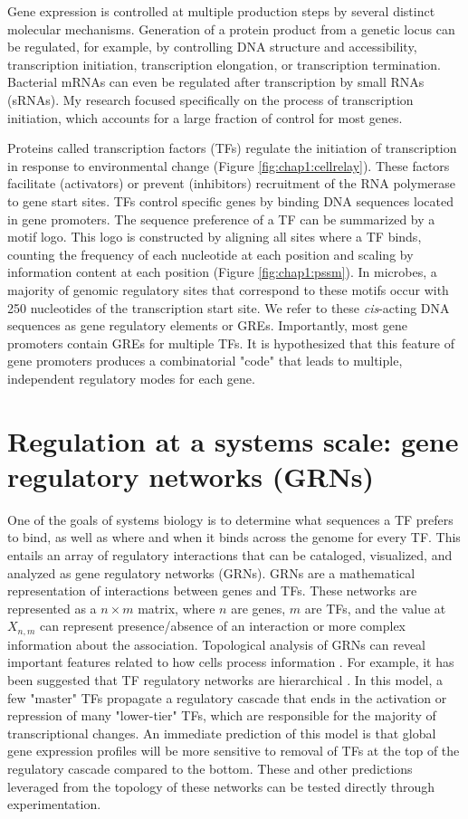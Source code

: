 \documentclass{article}
\begin{document}
Gene expression is controlled at multiple production steps by several distinct molecular mechanisms. Generation of a protein product from a genetic locus can be regulated, for example, by controlling DNA structure and accessibility, transcription initiation, transcription elongation, or transcription termination. Bacterial mRNAs can even be regulated after transcription by small RNAs (sRNAs). My research focused specifically on the process of transcription initiation, which accounts for a large fraction of control for most genes. 

Proteins called transcription factors (TFs) regulate the initiation of transcription in response to environmental change (Figure \ref{fig:chap1:cellrelay}). These factors facilitate (activators) or prevent (inhibitors) recruitment of the RNA polymerase to gene start sites. TFs control specific genes by binding DNA sequences located in gene promoters. The sequence preference of a TF can be summarized by a motif logo. This logo is constructed by aligning all sites where a TF binds, counting the frequency of each nucleotide at each position and scaling by information content at each position (Figure \ref{fig:chap1:pssm}). In microbes, a majority of genomic regulatory sites that correspond to these motifs occur with 250 nucleotides of the transcription start site. We refer to these \textit{cis}-acting DNA sequences as gene regulatory elements or GREs. Importantly, most gene promoters contain GREs for multiple TFs. It is hypothesized that this feature of gene promoters produces a combinatorial "code" that leads to multiple, independent regulatory modes for each gene. 

\section{Regulation at a systems scale: gene regulatory networks (GRNs)}

One of the goals of systems biology is to determine what sequences a TF prefers to bind, as well as where and when it binds across the genome for every TF. This entails an array of regulatory interactions that can be cataloged, visualized, and analyzed as gene regulatory networks (GRNs). GRNs are a mathematical representation of interactions between genes and TFs. These networks are represented as a $n \times m$ matrix, where $n$ are genes, $m$ are TFs, and the value at $X_{n,m}$ can represent presence/absence of an interaction or more complex information about the association. Topological analysis of GRNs can reveal important features related to how cells process information \cite{barabasi_network_2004}. For example, it has been suggested that TF regulatory networks are hierarchical \cite{yu_genomic_2006}. In this model, a few "master" TFs propagate a regulatory cascade that ends in the activation or repression of many "lower-tier" TFs, which are responsible for the majority of transcriptional changes. An immediate prediction of this model is that global gene expression profiles will be more sensitive to removal of TFs at the top of the regulatory cascade compared to the bottom. These and other predictions leveraged from the topology of these networks can be tested directly through experimentation. 
\end{document}
